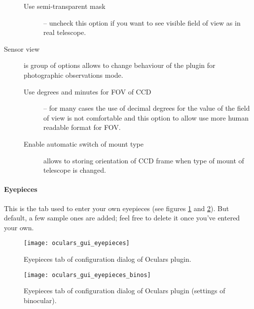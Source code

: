 \begin{description}
\begin{description}
   \item[Use semi-transparent mask]-- uncheck this option if you want to see visible field of view as in real telescope.
 \end{description}
\item[Sensor view] is group of options allows to change behaviour of the plugin for photographic observations mode.
 \begin{description}
   \item[Use degrees and minutes for FOV of CCD] -- for many cases the use of decimal degrees for the value of the field of view is not comfortable and this option to allow use more human readable format for FOV.
   \item[Enable automatic switch of mount type] allows to storing orientation of CCD frame when type of mount of telescope is changed.
 \end{description}
\end{description}

\paragraph{Eyepieces}

This is the tab used to enter your own eyepieces (see figures \ref{fig:plugins:Oculars:Gui:Eyepieces} and \ref{fig:plugins:Oculars:Gui:Eyepieces_binos}). But default, a few sample ones are added; feel free to delete it once you've entered your own.

\begin{figure}[ht]\centering
\texttt{[image: oculars\_gui\_eyepieces]}
\caption{Eyepieces tab of configuration dialog of Oculars plugin.}
\label{fig:plugins:Oculars:Gui:Eyepieces}
\end{figure}

\begin{figure}[ht]\centering
\texttt{[image: oculars\_gui\_eyepieces\_binos]}
\caption{Eyepieces tab of configuration dialog of Oculars plugin (settings of binocular).}
\label{fig:plugins:Oculars:Gui:Eyepieces_binos}
\end{figure}


